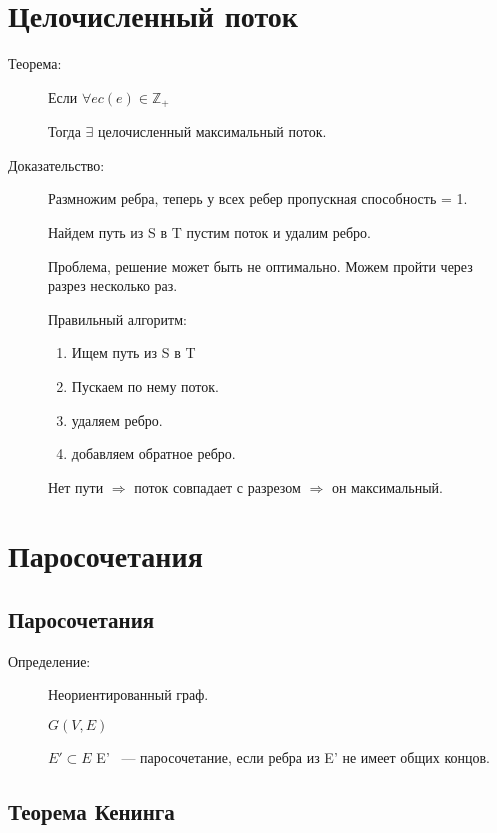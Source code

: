 \documentclass[12pt]{article}
\begin{document}
\section{Целочисленный поток}
\begin{description}
\item[Теорема:]

Если $\forall e c(e) \in \mathbb Z_+$

Тогда $\exists$ целочисленный максимальный поток.

\item[Доказательство:]

Размножим ребра, теперь у всех ребер пропускная способность = 1.

Найдем путь из S в T пустим поток и удалим ребро. 

Проблема, решение может быть не оптимально. Можем пройти через разрез несколько раз. 

Правильный алгоритм:

\begin{enumerate}
\item Ищем путь из S в T
\item Пускаем по нему поток.
\item удаляем ребро.
\item добавляем обратное ребро.
\end{enumerate}

Нет пути $\Rightarrow$ поток совпадает с разрезом $\Rightarrow$ он максимальный. 
\end{description}

\section{Паросочетания}
\subsection{Паросочетания}
\begin{description}
\item [Определение:] Неориентированный граф.

$G(V, E)$

$E' \subset E$ E' ~--- паросочетание, если ребра из E' не имеет общих концов.  

\end{description}

\subsection{Теорема Кенинга}
\end{document}
